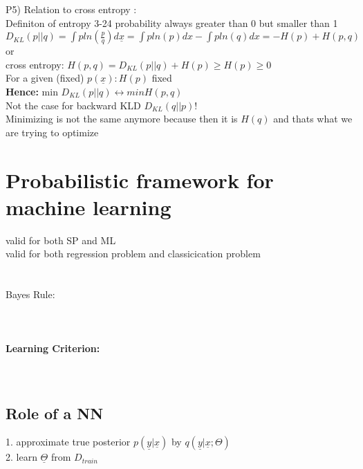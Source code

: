 P5) Relation to cross entropy : \\
Definiton of entropy 3-24
probability always greater than 0 but smaller than 1 \\
$
D _ {KL } (p || q) = \int p ln(\frac{p}{q}) d \underline{x} = \int p ln(p) dx - \int p ln(q) dx = - H(p) + H(p,q)  $ or \\
cross entropy: $ H(p,q) = D _ {KL } (p || q) + H(p) \geq H(p) \geq 0$ \\
For a given (fixed) $p(\underline{x}) : H(p)$ fixed \\
\textbf{Hence: } min $D _ {KL } (p || q) \leftrightarrow min H(p,q)$ \\
Not the case for backward KLD $D _ {KL } (q || p)$! \\
Minimizing is not the same anymore because then it is $H(q)$ and thats what we are trying to optimize
\section{Probabilistic framework for machine learning}
valid for both SP and ML \\
valid for both regression problem and classicication problem \\
 \\
 \\
Bayes Rule: \\
 \\
 \\
 \\
\textbf{Learning Criterion: } \\
 \\
 \\
\subsection{Role of a NN }

1. approximate true posterior $p(\underline{y} | \underline{x}) $ by $ q (\underline{y} | \underline{x} ; \Theta)$ \\
2. learn $\underline{ \Theta }$ from $D_ {train }$